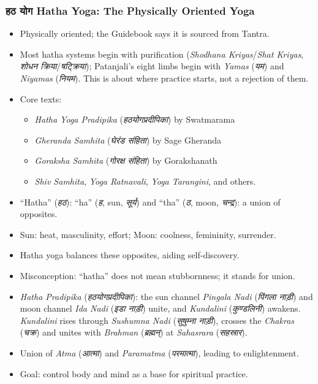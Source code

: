 \begin{frame}[fragile,shrink=6]\frametitle{हठ योग Hatha Yoga: The Physically Oriented Yoga}
    
\begin{itemize}
    \item Physically oriented; the Guidebook says it is sourced from Tantra.
    \item Most hatha systems begin with purification (\textit{Shodhana Kriyas}/\textit{Shat Kriyas}, \textit{शोधन क्रिया}/\textit{षट्क्रिया}); Patanjali's eight limbs begin with \textit{Yamas} (\textit{यम}) and \textit{Niyamas} (\textit{नियम}). This is about where practice starts, not a rejection of them.
    \item Core texts:
    \begin{itemize}
        \item \textit{Hatha Yoga Pradipika} (\textit{हठयोगप्रदीपिका}) by Swatmarama
        \item \textit{Gheranda Samhita} (\textit{घेरंड संहिता}) by Sage Gheranda
        \item \textit{Goraksha Samhita} (\textit{गोरक्ष संहिता}) by Gorakshanath
        \item \textit{Shiv Samhita}, \textit{Yoga Ratnavali}, \textit{Yoga Tarangini}, and others.
    \end{itemize}
    \item ``Hatha'' (\textit{हठ}): ``ha'' (\textit{ह}, sun, \textit{सूर्य}) and ``tha'' (\textit{ठ}, moon, \textit{चन्द्र}): a union of opposites.
    \item Sun: heat, masculinity, effort; Moon: coolness, femininity, surrender.
    \item Hatha yoga balances these opposites, aiding self-discovery.
    \item Misconception: ``hatha'' does not mean stubbornness; it stands for union.
    \item \textit{Hatha Pradipika} (\textit{हठयोगप्रदीपिका}): the sun channel \textit{Pingala Nadi} (\textit{पिंगला नाड़ी}) and moon channel \textit{Ida Nadi} (\textit{इडा नाड़ी}) unite, and \textit{Kundalini} (\textit{कुण्डलिनी}) awakens.
    \textit{Kundalini} rises through \textit{Sushumna Nadi} (\textit{सुषुम्ना नाड़ी}), crosses the \textit{Chakras} (\textit{चक्र}) and unites with \textit{Brahman} (\textit{ब्रह्मन्}) at \textit{Sahasrara} (\textit{सहस्रार}).
    \item Union of \textit{Atma} (\textit{आत्मा}) and \textit{Paramatma} (\textit{परमात्मा}), leading to enlightenment.
    \item Goal: control body and mind as a base for spiritual practice.
\end{itemize}
    
\end{frame}


